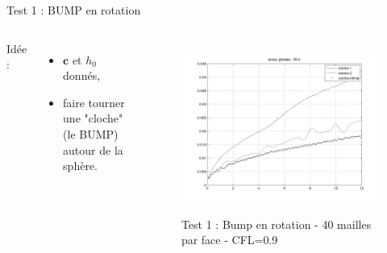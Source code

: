 \documentclass[11pt]{beamer}
\begin{document}
\begin{frame}{Test 1 : BUMP en rotation}
\begin{columns}
Idée :

\begin{itemize}
\item $\mathbf{c}$ et $h_0$ donnés,

\item faire tourner une "cloche" (le BUMP) autour de la sphère.
\end{itemize}



\begin{figure}
\href{run:CSapprox_test0.avi}{\includegraphics[scale=0.25]{normerreur_test0_100cfl90.png}} 
\caption{Test 1 : Bump en rotation - 40 mailles par face - CFL=0.9}
\end{figure}

\end{columns}
\end{frame}
\end{document}
